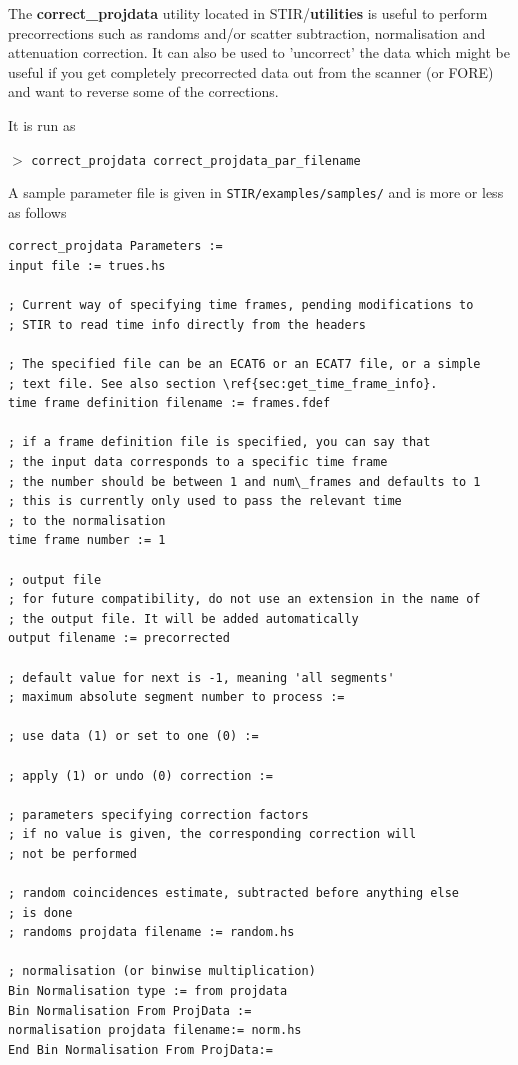 \documentclass{article}
\newcommand{\cmdline}[1]{\par \noindent $>$ \texttt{#1}\par}
\begin{document}
{{The \textbf{correct\_projdata} utility located in STIR/\textbf{utilities} 
is useful to perform precorrections such as randoms and/or scatter 
subtraction, normalisation and attenuation correction. It can 
also be used to 'uncorrect' the data which might be useful if 
you get completely precorrected data out from the scanner (or 
FORE) and want to reverse some of the corrections.


It is run as
\cmdline{correct\_projdata correct\_projdata\_par\_filename}


A sample parameter file is given in \texttt{STIR/examples/samples/} and 
is more or less as follows

\begin{verbatim}
correct_projdata Parameters := 
input file := trues.hs

; Current way of specifying time frames, pending modifications to
; STIR to read time info directly from the headers

; The specified file can be an ECAT6 or an ECAT7 file, or a simple
; text file. See also section \ref{sec:get_time_frame_info}. 
time frame definition filename := frames.fdef

; if a frame definition file is specified, you can say that 
; the input data corresponds to a specific time frame
; the number should be between 1 and num\_frames and defaults to 1
; this is currently only used to pass the relevant time 
; to the normalisation 
time frame number := 1

; output file
; for future compatibility, do not use an extension in the name of 
; the output file. It will be added automatically 
output filename := precorrected

; default value for next is -1, meaning 'all segments' 
; maximum absolute segment number to process :=  

; use data (1) or set to one (0) := 

; apply (1) or undo (0) correction := 

; parameters specifying correction factors 
; if no value is given, the corresponding correction will
; not be performed

; random coincidences estimate, subtracted before anything else 
; is done
; randoms projdata filename := random.hs 

; normalisation (or binwise multiplication) 
Bin Normalisation type := from projdata 
Bin Normalisation From ProjData := 
normalisation projdata filename:= norm.hs 
End Bin Normalisation From ProjData:=


\end{verbatim}}}
\end{document}
